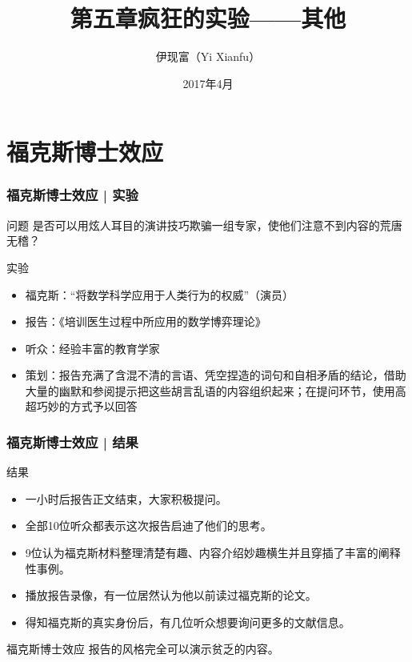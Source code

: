 



\title[其他]{第五章\quad 疯狂的实验——其他}
\author[Yixf]{伊现富（Yi Xianfu）}
\date{2017年4月}



\section{福克斯博士效应}
\begin{frame}
  \frametitle{福克斯博士效应 | 实验}
  \begin{block}{问题}
 是否可以用炫人耳目的演讲技巧欺骗一组专家，使他们注意不到内容的荒唐无稽？ 
  \end{block}
  \pause
  \begin{block}{实验}
    \begin{itemize}
      \item 福克斯：“将数学科学应用于人类行为的权威”（演员）
      \item 报告：《培训医生过程中所应用的数学博弈理论》
      \item 听众：经验丰富的教育学家
      \item 策划：报告充满了含混不清的言语、凭空捏造的词句和自相矛盾的结论，借助大量的幽默和参阅提示把这些胡言乱语的内容组织起来；在提问环节，使用高超巧妙的方式予以回答
    \end{itemize}
  \end{block}
\end{frame}

\begin{frame}
  \frametitle{福克斯博士效应 | 结果}
  \begin{block}{结果}
    \begin{itemize}
      \item 一小时后报告正文结束，大家积极提问。
      \item 全部10位听众都表示这次报告启迪了他们的思考。
      \item 9位认为福克斯材料整理清楚有趣、内容介绍妙趣横生并且穿插了丰富的阐释性事例。
      \item 播放报告录像，有一位居然认为他以前读过福克斯的论文。
      \item 得知福克斯的真实身份后，有几位听众想要询问更多的文献信息。
    \end{itemize}
  \end{block}
  \pause
  \begin{block}{福克斯博士效应}
    报告的风格完全可以演示贫乏的内容。
  \end{block}
\end{frame}

